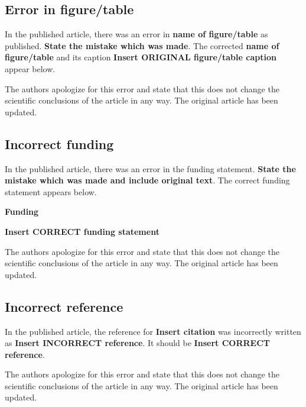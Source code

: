 \documentclass[utf8]{frontiers_correction}
\begin{document}
\vspace{5mm}
\subsection*{Error in figure/table}
In the published article, there was an error in \textbf{name of figure/table} as published. \textbf{State the mistake which was made}. The corrected \textbf{name of figure/table} and its caption \textbf{Insert ORIGINAL figure/table caption} appear below.\par The authors apologize for this error and state that this does not change the scientific conclusions of the article in any way. The original article has been updated.


\vspace{5mm}
\subsection*{Incorrect funding}
In the published article, there was an error in the funding statement. \textbf{State the mistake which was made and include original text}. The correct funding statement appears below.\par
\textbf{Funding}\par
\textbf{Insert CORRECT funding statement}\par
The authors apologize for this error and state that this does not change the scientific conclusions of the article in any way. The original article has been updated.


\vspace{5mm}
\subsection*{Incorrect reference}
In the published article, the reference for \textbf{Insert citation} was incorrectly written as \textbf{Insert INCORRECT reference}. It should be \textbf{Insert CORRECT reference}. \par The authors apologize for this error and state that this does not change the scientific conclusions of the article in any way. The original article has been updated.
\end{document}
